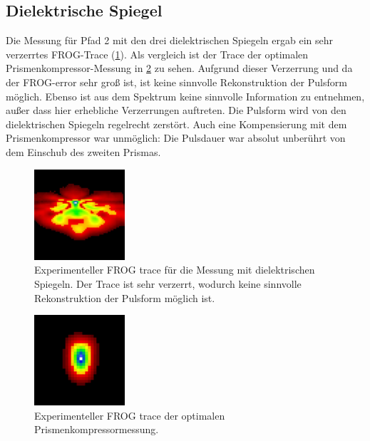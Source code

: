 \documentclass[twoside,        %
               BCOR12mm,       %
               english,ngerman, %
               fleqn,headsepline=false,footsepline=false
              ]{Vorlage/MFPREPORT}
\begin{document}
\subsection{Dielektrische Spiegel}
Die Messung für Pfad 2 mit den drei dielektrischen Spiegeln ergab ein sehr
verzerrtes FROG-Trace (\cref{fig:diel}). Als vergleich ist der Trace der optimalen
Prismenkompressor-Messung in \cref{fig:opttrace} zu sehen. Aufgrund dieser
Verzerrung und da der FROG-error sehr groß ist, ist keine sinnvolle
Rekonstruktion der Pulsform möglich. Ebenso ist aus dem Spektrum keine
sinnvolle Information zu entnehmen, außer dass hier erhebliche Verzerrungen
auftreten. Die Pulsform wird von den dielektrischen Spiegeln regelrecht
zerstört. Auch eine Kompensierung mit dem Prismenkompressor war unmöglich: Die
Pulsdauer war absolut unberührt von dem Einschub des zweiten Prismas.

\begin{figure}[]
    \centering
    \includegraphics[width=0.3\textwidth]{diel.jpg}
    \caption{Experimenteller FROG trace für die Messung mit dielektrischen
    Spiegeln. Der Trace ist sehr verzerrt, wodurch keine sinnvolle
Rekonstruktion der Pulsform möglich ist. }
    \label{fig:diel}
\end{figure}
\begin{figure}[]
    \centering
    \includegraphics[width=0.3\textwidth]{opttrace.jpg}
    \caption{Experimenteller FROG trace der optimalen Prismenkompressormessung.}
    \label{fig:opttrace}
\end{figure}
\end{document}
